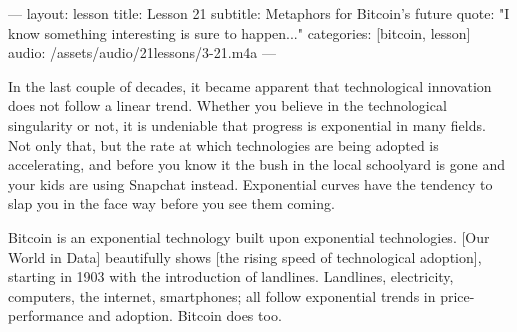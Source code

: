 ---
layout: lesson
title: Lesson 21
subtitle: Metaphors for Bitcoin's future
quote: "I know something interesting is sure to happen..."
categories: [bitcoin, lesson]
audio: /assets/audio/21lessons/3-21.m4a
---

In the last couple of decades, it became apparent that technological
innovation does not follow a linear trend. Whether you believe in the
technological singularity or not, it is undeniable that progress is
exponential in many fields. Not only that, but the rate at which
technologies are being adopted is accelerating, and before you know it
the bush in the local schoolyard is gone and your kids are using
Snapchat instead. Exponential curves have the tendency to slap you in
the face way before you see them coming.

Bitcoin is an exponential technology built upon exponential
technologies. [Our World in Data] beautifully shows [the rising speed of
technological adoption], starting in 1903 with the introduction of
landlines. Landlines, electricity, computers, the internet, smartphones;
all follow exponential trends in price-performance and adoption. Bitcoin
does too.

